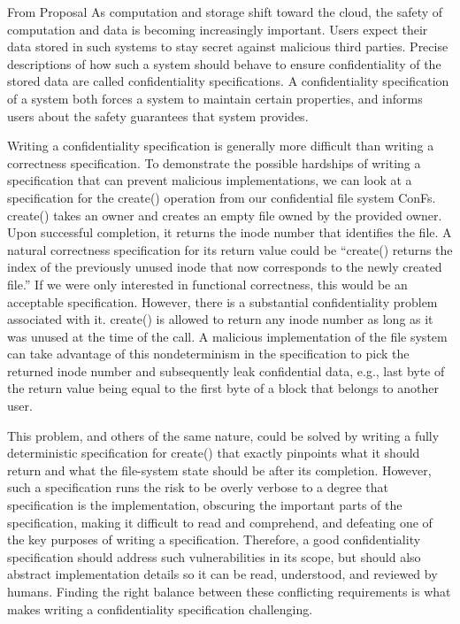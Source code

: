 \iffalse

{\red From Proposal}
As computation and storage shift toward the cloud, the safety of computation and data is becoming increasingly important. Users expect their data stored in such systems to stay secret against malicious third parties. Precise descriptions of how such a system should behave to ensure confidentiality of the stored data are called confidentiality specifications. A confidentiality specification of a system both forces a system to maintain certain properties, and informs users about the safety guarantees that system provides. 

Writing a confidentiality specification is generally more difficult than writing a correctness specification. To demonstrate the possible hardships of writing a specification that can prevent malicious implementations, we can look at a specification for the create() operation from our confidential file system ConFs. create() takes an owner and creates an empty file owned by the provided owner. Upon successful completion, it returns the inode number that identifies the file. A natural correctness specification for its return value could be “create() returns the index of the previously unused inode that now corresponds to the newly created file.” If we were only interested in functional correctness, this would be an acceptable specification. However, there is a substantial confidentiality problem associated with it. create() is allowed to return any inode number as long as it was unused at the time of the call. A malicious implementation of the file system can take advantage of this nondeterminism in the specification to pick the returned inode number and subsequently leak confidential data, e.g., last byte of the return value being equal to the first byte of a block that belongs to another user.

This problem, and others of the same nature, could be solved by writing a fully deterministic specification for create() that exactly pinpoints what it should return and what the file-system state should be after its completion. However, such a specification runs the risk to be overly verbose to a degree that specification is the implementation, obscuring the important parts of the specification, making it difficult to read and comprehend, and defeating one of the key purposes of writing a specification. Therefore, a good confidentiality specification should address such vulnerabilities in its scope, but should also abstract implementation details so it can be read, understood, and reviewed by humans. Finding the right balance between these conflicting requirements is what makes writing a confidentiality specification challenging.

